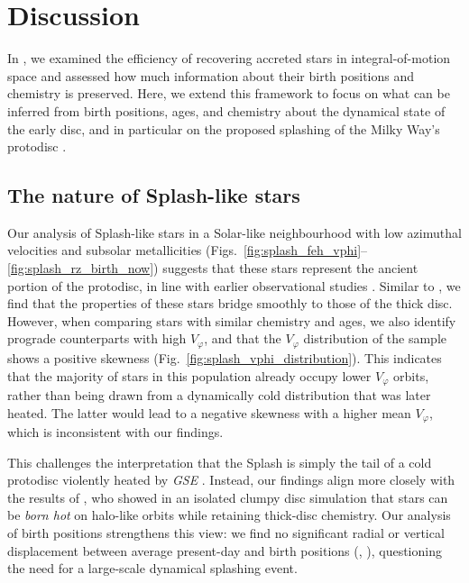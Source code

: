 \documentclass[fleqn,usenatbib]{mnras}
\begin{document}
\section{Discussion}
\label{sec:discussion}

In , we examined the efficiency of recovering accreted stars in integral-of-motion space and assessed how much information about their birth positions and chemistry is preserved. Here, we extend this framework to focus on what can be inferred from birth positions, ages, and chemistry about the dynamical state of the early disc, and in particular on the proposed splashing of the Milky Way's protodisc \citep{Belokurov2020}.

\subsection{The nature of Splash-like stars}

Our analysis of Splash-like stars in a Solar-like neighbourhood with low azimuthal velocities and subsolar metallicities (Figs.~\ref{fig:splash_feh_vphi}--\ref{fig:splash_rz_birth_now}) suggests that these stars represent the ancient portion of the protodisc, in line with earlier observational studies \citep{Bonaca2017, Haywood2018b, DiMatteo2019, Gallart2019, Belokurov2020}. Similar to \citet{Belokurov2020}, we find that the properties of these stars bridge smoothly to those of the thick disc. However, when comparing stars with similar chemistry and ages, we also identify prograde counterparts with high $V_\varphi$, and that the $V_\varphi$ distribution of the sample shows a positive skewness (Fig.~\ref{fig:splash_vphi_distribution}). This indicates that the majority of stars in this population already occupy lower $V_\varphi$ orbits, rather than being drawn from a dynamically cold distribution that was later heated. The latter would lead to a negative skewness with a higher mean $V_\varphi$, which is inconsistent with our findings.

This challenges the interpretation that the Splash is simply the tail of a cold protodisc violently heated by \textit{GSE} \citep{DiMatteo2019, Belokurov2020}. Instead, our findings align more closely with the results of \citet{Amarante2020}, who showed in an isolated clumpy disc simulation that stars can be \emph{born hot} on halo-like orbits while retaining thick-disc chemistry. Our analysis of birth positions strengthens this view: we find no significant radial or vertical displacement between average present-day and birth positions (, ), questioning the need for a large-scale dynamical splashing event.
\end{document}
